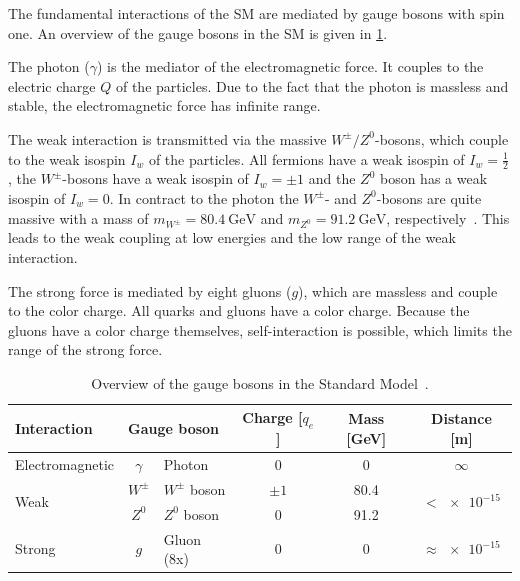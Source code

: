 The fundamental interactions of the SM are mediated by gauge bosons with spin one.
An overview of the gauge bosons in the SM is given in \cref{tab:theory:bosons}.

The photon ($\gamma$) is the mediator of the electromagnetic force.
It couples to the electric charge $Q$ of the particles.
Due to the fact that the photon is massless and stable, the electromagnetic force has infinite range.

The weak interaction is transmitted via the massive $W^\pm/Z^0$-bosons, which couple to the weak isospin $I_w$ of the particles.
All fermions have a weak isospin of $I_w = \frac{1}{2}$, the $W^\pm$-bosons have a weak isospin of $I_w = \pm 1$ and the $Z^0$ boson
has a weak isospin of $I_w = 0$. %
In contract to the photon the $W^\pm$- and $Z^0$-bosons are quite massive with a mass of $m_{W^\pm} = \SI{80.4}{\GeV}$ and
$m_{Z^0} = \SI{91.2}{\GeV}$, respectively~\cite{PDG}.
This leads to the weak coupling at low energies and the low range of the weak interaction.

The strong force is mediated by eight gluons ($g$), which are massless and couple to the color charge.
All quarks and gluons have a color charge.
Because the gluons have a color charge themselves, self-interaction is possible, which limits the range of the
strong force.

\begin{table}[htpb]
    \centering
    \caption{Overview of the gauge bosons in the Standard Model~\cite{PDG}.}\label{tab:theory:bosons}
    \begin{tabular}{lclccc}
        \toprule
        Interaction             & \multicolumn{2}{l}{Gauge boson}   & Charge [$q_e$]    & Mass [GeV] & Distance [m] \\  \midrule
        Electromagnetic         & $\gamma$  & Photon                & $0$               & 0          & $\infty$                         \\ \cmidrule{1-6}
        \multirow{2}{*}{Weak}   & $W^\pm$   & $W^\pm$ boson         & $\pm 1$           & 80.4       & \multirow{2}{*}{$< \num{e-15}$}  \\
                                & $Z^0$     & $Z^0$ boson           & $0$               & 91.2       &                                  \\ \cmidrule{1-6}
        Strong                  & $g$       & Gluon (8x)            & $0$               & 0          & $\approx \num{e-15}$             \\
        \bottomrule
    \end{tabular}
\end{table}


